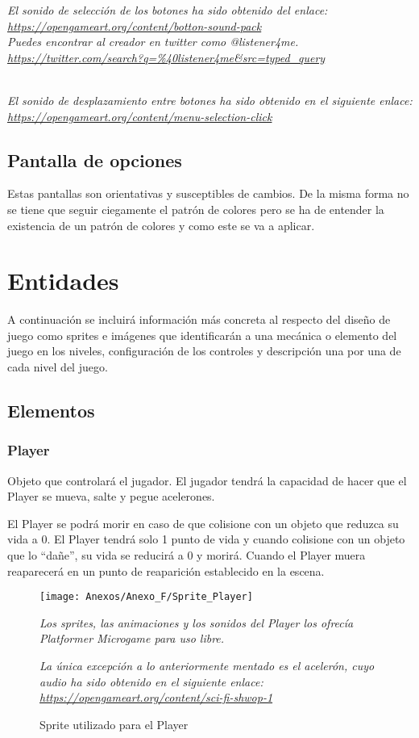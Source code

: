 \textit{El sonido de selección de los botones ha sido obtenido del enlace: \url{https://opengameart.org/content/botton-sound-pack}}
\textit{\\Puedes encontrar al creador en twitter como @listener4me. \url{https://twitter.com/search?q=\%40listener4me&src=typed_query}}

\textit{\\El sonido de desplazamiento entre botones ha sido obtenido en el siguiente enlace: \url{https://opengameart.org/content/menu-selection-click}}

\subsection{Pantalla de opciones}

Estas pantallas son orientativas y susceptibles de cambios. De la misma forma no se tiene que seguir ciegamente el patrón de colores pero se ha de entender la existencia de un patrón de colores y como este se va a aplicar.

\section{Entidades}
A continuación se incluirá información más concreta al respecto del diseño de juego como sprites e imágenes que identificarán a una mecánica o elemento del juego en los niveles, configuración de los controles y descripción una por una de cada nivel del juego.

\subsection{Elementos}
\subsubsection{Player}
Objeto que controlará el jugador. El jugador tendrá la capacidad de hacer que el Player se mueva, salte y pegue acelerones.

El Player se podrá morir en caso de que colisione con un objeto que reduzca su vida a 0. El Player tendrá solo 1 punto de vida y cuando colisione con un objeto que lo “dañe”, su vida se reducirá a 0 y morirá. Cuando el Player muera reaparecerá en un punto de reaparición establecido en la escena.

\begin{figure}[h]
\centering
\texttt{[image: Anexos/Anexo\_F/Sprite\_Player]}
\caption{Sprite utilizado para el Player}
\raggedright
\textit{Los sprites, las animaciones y los sonidos del Player los ofrecía Platformer Microgame para uso libre.}

\textit{La única excepción a lo anteriormente mentado es el acelerón, cuyo audio ha sido obtenido en el siguiente enlace: \url{https://opengameart.org/content/sci-fi-shwop-1}}
\end{figure}
\clearpage

